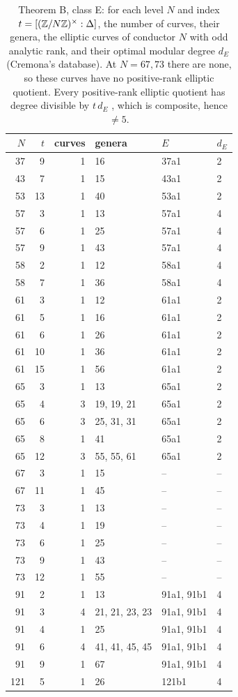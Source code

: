 \begin{table}[ht]\centering\small
\caption{Theorem B, class E: for each level $N$ and index $t=[(\mathbb{Z}/N\mathbb{Z})^\times:\Delta]$, the number of curves, their genera,
 the elliptic curves of conductor $N$ with odd analytic rank, and their optimal modular degree $d_E$ (Cremona's
 database). At $N=67,73$ there are none, so these curves have no positive-rank elliptic quotient. Every positive-rank elliptic quotient has degree divisible by $t\,d_E$
 \cite[Corollary~4.10]{DerickxOrlic2026}, which is composite, hence $\ne5$.}\label{tab:classE}
\begin{tabular}{rrrlll}\toprule $N$&$t$&curves&genera&$E$&$d_E$\\\midrule
37&9&1&16&37a1&2\\
43&7&1&15&43a1&2\\
53&13&1&40&53a1&2\\
57&3&1&13&57a1&4\\
57&6&1&25&57a1&4\\
57&9&1&43&57a1&4\\
58&2&1&12&58a1&4\\
58&7&1&36&58a1&4\\
61&3&1&12&61a1&2\\
61&5&1&16&61a1&2\\
61&6&1&26&61a1&2\\
61&10&1&36&61a1&2\\
61&15&1&56&61a1&2\\
65&3&1&13&65a1&2\\
65&4&3&19, 19, 21&65a1&2\\
65&6&3&25, 31, 31&65a1&2\\
65&8&1&41&65a1&2\\
65&12&3&55, 55, 61&65a1&2\\
67&3&1&15&--&--\\
67&11&1&45&--&--\\
73&3&1&13&--&--\\
73&4&1&19&--&--\\
73&6&1&25&--&--\\
73&9&1&43&--&--\\
73&12&1&55&--&--\\
91&2&1&13&91a1, 91b1&4\\
91&3&4&21, 21, 23, 23&91a1, 91b1&4\\
91&4&1&25&91a1, 91b1&4\\
91&6&4&41, 41, 45, 45&91a1, 91b1&4\\
91&9&1&67&91a1, 91b1&4\\
121&5&1&26&121b1&4\\
\bottomrule\end{tabular}\end{table}
